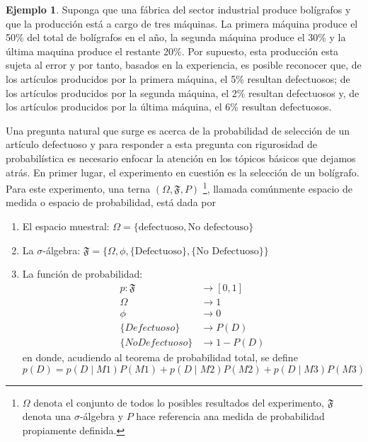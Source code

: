 \documentclass[
  10pt,
  spanish,
]{book}
\providecommand{\tightlist}{%
  \setlength{\itemsep}{0pt}\setlength{\parskip}{0pt}}
\theoremstyle{definition}
\theoremstyle{definition}
\newtheorem{example}{Ejemplo}[chapter]
\theoremstyle{definition}
\theoremstyle{definition}
\theoremstyle{remark}
\begin{document}
\begin{example}
\protect\hypertarget{exm:unnamed-chunk-11}{}{\label{exm:unnamed-chunk-11} }Suponga que una fábrica del sector industrial produce bolígrafos y que la producción está a cargo de tres máquinas. La primera máquina produce el 50\% del total de bolígrafos en el año, la segunda máquina produce el 30\% y la última maquina produce el restante 20\%. Por supuesto, esta producción esta sujeta al error y por tanto, basados en la experiencia, es posible reconocer que, de los artículos producidos por la primera máquina, el 5\% resultan defectuosos; de los artículos producidos por la segunda máquina, el 2\% resultan defectuosos y, de los artículos producidos por la última máquina, el 6\% resultan defectuosos.

Una pregunta natural que surge es acerca de la probabilidad de selección de un artículo defectuoso y para responder a esta pregunta con rigurosidad de probabilística es necesario enfocar la atención en los tópicos básicos que dejamos atrás. En primer lugar, el experimento en cuestión es la selección de un bolígrafo. Para este experimento, una terna \((\Omega, \mathfrak{F}, P)\) \footnote{\(\Omega\) denota el conjunto de todos lo posibles resultados del experimento, \(\mathfrak{F}\) denota una \(\sigma\)-álgebra y \(P\) hace referencia ana medida de probabilidad propiamente definida.}, llamada comúnmente espacio de medida o espacio de probabilidad, está dada por

\begin{enumerate}
\def\labelenumi{\arabic{enumi}.}
\tightlist
\item
  El espacio muestral: \(\Omega=\{\text{defectuoso}, \text{No defectouso}\}\)
\item
  La \(\sigma\)-álgebra: \(\mathfrak{F}=\{\Omega, \phi, \{\text{Defectuoso}\}, \{\text{No Defectuoso}\}\}\)
\item
  La función de probabilidad:
  \begin{align*}
    p: \mathfrak{F} &\longrightarrow [0,1]\\
    \Omega &\longrightarrow 1\\
    \phi &\longrightarrow 0\\
    \{Defectuoso\}&\longrightarrow P(D)\\
    \{No Defectuoso\}&\longrightarrow 1-P(D)
    \end{align*}
  en donde, acudiendo al teorema de probabilidad total, se define
  \begin{equation*}
    p(D)=p(D \mid M1)P(M1)+p(D \mid M2)P(M2)+p(D \mid M3)P(M3)
    \end{equation*}
\end{enumerate}


\end{example}
\end{document}
